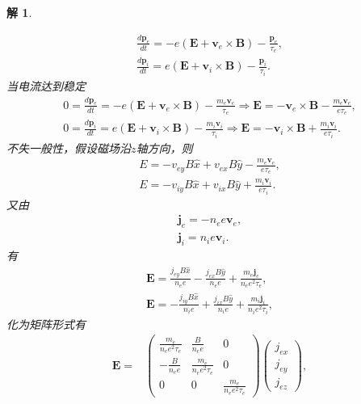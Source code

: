 \documentclass[UTF8,10pt,a4paper]{article}
\theoremstyle{Problem}
\theoremstyle{Solution}
\newtheorem*{sol}{解}
\begin{document}
\begin{sol}
\begin{enumerate}
\begin{gather}
            \frac{d\bm{p}_e}{dt}=-e(\bm{E}+\bm{v}_e\times\bm{B})-\frac{\bm{p}_e}{\tau_e},\\
            \frac{d\bm{p}_i}{dt}=e(\bm{E}+\bm{v}_i\times\bm{B})-\frac{\bm{p}_i}{\tau_i}.
        \end{gather}
        当电流达到稳定
        \begin{gather}
            0=\frac{d\bm{p}_e}{dt}=-e(\bm{E}+\bm{v}_e\times\bm{B})-\frac{m_e\bm{v}_e}{\tau_e}\Longrightarrow\bm{E}=-\bm{v}_e\times\bm{B}-\frac{m_e\bm{v}_e}{e\tau_e},\\
            0=\frac{d\bm{p}_i}{dt}=e(\bm{E}+\bm{v}_i\times\bm{B})-\frac{m_i\bm{v}_i}{\tau_i}\Longrightarrow\bm{E}=-\bm{v}_i\times\bm{B}+\frac{m_i\bm{v}_i}{e\tau_i}.
        \end{gather}
        不失一般性，假设磁场沿$z$轴方向，则
        \begin{gather}
            E=-v_{ey}B\hat{x}+v_{ex}B\hat{y}-\frac{m_e\bm{v}_e}{e\tau_e},\\
            E=-v_{iy}B\hat{x}+v_{ix}B\hat{y}+\frac{m_i\bm{v}_i}{e\tau_i}.
        \end{gather}
        又由
        \begin{gather}
            \bm{j}_e=-n_ee\bm{v}_e,\\
            \bm{j}_i=n_ie\bm{v}_i.
        \end{gather}
        有
        \begin{gather}
            \bm{E}=\frac{j_{ey}B\hat{x}}{n_ee}-\frac{j_{ex}B\hat{y}}{n_ee}+\frac{m_e\bm{j}_e}{n_ee^2\tau_e},\\
            \bm{E}=-\frac{j_{iy}B\hat{x}}{n_ie}+\frac{j_{ix}B\hat{y}}{n_ie}+\frac{m_i\bm{j}_i}{n_ie^2\tau_i},
        \end{gather}
        化为矩阵形式有
        \begin{align}
            \bm{E}=&\left(\begin{matrix}
                \frac{m_e}{n_ee^2\tau_e}&\frac{B}{n_ee}&0\\
                -\frac{B}{n_ee}&\frac{m_e}{n_ee^2\tau_e}&0\\
                0&0&\frac{m_e}{n_ee^2\tau_e}
            \end{matrix}\right)\left(\begin{matrix}
                j_{ex}\\
                j_{ey}\\
                j_{ez}
            \end{matrix}\right),\\

\end{align}
\end{enumerate}
\end{sol}
\end{document}
